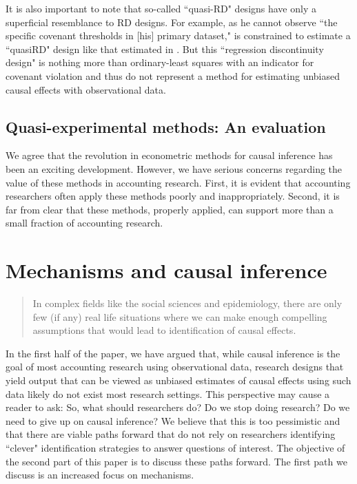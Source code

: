 \documentclass[11pt,reqno]{amsart}
\begin{document}
It is also important to note that so-called ``quasi-RD" designs have only a superficial resemblance to RD designs.
For example, as he cannot observe ``the specific covenant thresholds in [his] primary dataset," \citet{Tan:2013ce} is constrained to estimate a ``quasiRD" design like that estimated in \citep{Roberts:2009ka}.
But this ``regression discontinuity design"  is nothing more than ordinary-least squares with an indicator for covenant violation and thus do not represent a method for estimating unbiased causal effects with observational data.


\subsection{Quasi-experimental methods: An evaluation}
We agree that the revolution in econometric methods for causal inference has been an exciting development.
However, we have serious concerns regarding the value of these methods in accounting research. 
First, it is evident that accounting researchers often apply these methods poorly and inappropriately.
Second, it is far from clear that these methods, properly applied, can support more than a small fraction of accounting research.

\section{Mechanisms and causal inference}

\begin{quotation}
In complex fields like the social sciences and epidemiology, there are only few (if any) real life situations where we can make enough compelling assumptions that would lead to identification of causal effects.
\end{quotation}

In the first half of the paper, we have argued that, while causal inference is the goal of most accounting research using observational data, research designs that yield output that can be viewed as unbiased estimates of causal effects using such data likely do not exist most research settings.
This perspective may cause a reader to ask: 
So, what should researchers do? Do we stop doing research? Do we need to give up on causal inference? 
We believe that this is too pessimistic and that there are viable paths forward that do not rely on researchers identifying ``clever" identification strategies to answer questions of interest.
The objective of the second part of this paper is to discuss these paths forward.
The first path we discuss is an increased focus on mechanisms.
\end{document}
